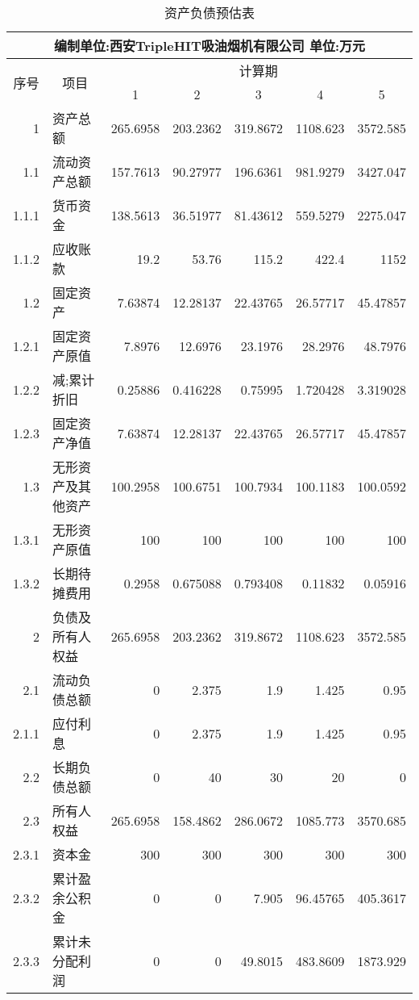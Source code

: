 \begin{enumerate}
      \begin{table}[H]
      \centering
      \caption{资产负债预估表}
      \begin{tabular}{|llrrrrr|}
      \toprule
      \multicolumn{7}{c}{编制单位:西安TripleHIT吸油烟机有限公司                             单位:万元} \\
      \hline
      \multicolumn{1}{c}{\multirow{2}[0]{*}{序号}} & \multicolumn{1}{c}{\multirow{2}[0]{*}{项目}} & \multicolumn{5}{c}{计算期} \\
          &       & \multicolumn{1}{c}{1} & \multicolumn{1}{c}{2} & \multicolumn{1}{c}{3} & \multicolumn{1}{c}{4} & \multicolumn{1}{c}{5} \\
      \hline
      \multicolumn{1}{r}{1} & 资产总额  & 265.6958 & 203.2362 & 319.8672 & 1108.623 & 3572.585 \\
      \multicolumn{1}{r}{1.1} & 流动资产总额 & 157.7613 & 90.27977 & 196.6361 & 981.9279 & 3427.047 \\
      1.1.1 & 货币资金  & 138.5613 & 36.51977 & 81.43612 & 559.5279 & 2275.047 \\
      1.1.2 & 应收账款  & 19.2  & 53.76 & 115.2 & 422.4 & 1152 \\
      \multicolumn{1}{r}{1.2} & 固定资产  & 7.63874 & 12.28137 & 22.43765 & 26.57717 & 45.47857 \\
      1.2.1 & 固定资产原值 & 7.8976 & 12.6976 & 23.1976 & 28.2976 & 48.7976 \\
      1.2.2 & 减;累计折旧 & 0.25886 & 0.416228 & 0.75995 & 1.720428 & 3.319028 \\
      1.2.3 & 固定资产净值 & 7.63874 & 12.28137 & 22.43765 & 26.57717 & 45.47857 \\
      \multicolumn{1}{r}{1.3} & 无形资产及其他资产 & 100.2958 & 100.6751 & 100.7934 & 100.1183 & 100.0592 \\
      1.3.1 & 无形资产原值 & 100   & 100   & 100   & 100   & 100 \\
      1.3.2 & 长期待摊费用 & 0.2958 & 0.675088 & 0.793408 & 0.11832 & 0.05916 \\
      \multicolumn{1}{r}{2} & 负债及所有人权益 & 265.6958 & 203.2362 & 319.8672 & 1108.623 & 3572.585 \\
      \multicolumn{1}{r}{2.1} & 流动负债总额 & 0     & 2.375 & 1.9   & 1.425 & 0.95 \\
      2.1.1 & 应付利息  & 0     & 2.375 & 1.9   & 1.425 & 0.95 \\
      \multicolumn{1}{r}{2.2} & 长期负债总额 & 0     & 40    & 30    & 20    & 0 \\
      \multicolumn{1}{r}{2.3} & 所有人权益 & 265.6958 & 158.4862 & 286.0672 & 1085.773 & 3570.685 \\
      2.3.1 & 资本金   & 300   & 300   & 300   & 300   & 300 \\
      2.3.2 & 累计盈余公积金 & 0     & 0     & 7.905 & 96.45765 & 405.3617 \\
      2.3.3 & 累计未分配利润 & 0     & 0     & 49.8015 & 483.8609 & 1873.929 \\
      \bottomrule
      \end{tabular}%
      \label{tab:addlabel}%
      \end{table}%
\end{enumerate}

